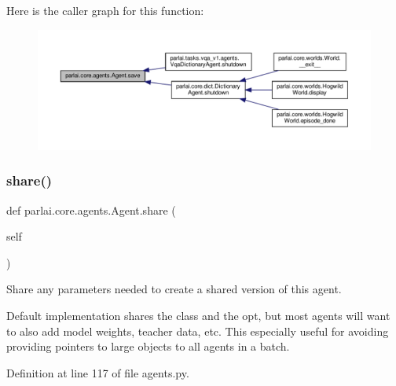 Here is the caller graph for this function\+:
\nopagebreak
\begin{figure}[H]
\begin{center}
\leavevmode
\includegraphics[width=350pt]{classparlai_1_1core_1_1agents_1_1Agent_a51e706e3e5389c9b48c7a1589d97ec99_icgraph}
\end{center}
\end{figure}
\mbox{\label{classparlai_1_1core_1_1agents_1_1Agent_afbbb06bf0f46ff927c8b186726a68b47}} 
\subsubsection{\texorpdfstring{share()}{share()}}
{\footnotesize\ttfamily def parlai.\+core.\+agents.\+Agent.\+share (\begin{DoxyParamCaption}\item[{}]{self }\end{DoxyParamCaption})}

\begin{DoxyVerb}Share any parameters needed to create a shared version of this agent.

Default implementation shares the class and the opt, but most agents will
want to also add model weights, teacher data, etc. This especially useful
for avoiding providing pointers to large objects to all agents in a batch.
\end{DoxyVerb}
 

Definition at line 117 of file agents.\+py.

\mbox{\label{classparlai_1_1core_1_1agents_1_1Agent_a801e5ca2a5e8e96a72f0c04549008e8f}} 
